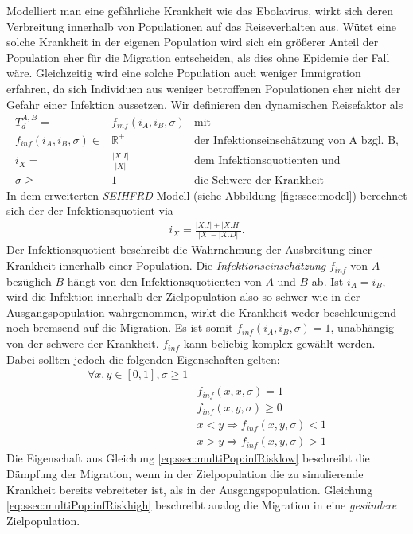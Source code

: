 Modelliert man eine gefährliche Krankheit wie das Ebolavirus, wirkt sich deren Verbreitung innerhalb von Populationen auf das Reiseverhalten aus. Wütet eine solche Krankheit in der eigenen Population wird sich ein größerer Anteil der Population eher für die Migration entscheiden, als dies ohne Epidemie der Fall wäre. Gleichzeitig wird eine solche Population auch weniger Immigration erfahren, da sich Individuen aus weniger betroffenen Populationen eher nicht der Gefahr einer Infektion aussetzen. Wir definieren den dynamischen Reisefaktor als
\begin{align}
	T^{A,B}_d =& f_{inf}(i_A,i_B, \sigma)&\text{mit}\\
	f_{inf}(i_A,i_B,\sigma) \in& \mathbb{R}^+&\text{der Infektionseinschätzung von A bzgl. B,}\label{eq:ssec:multiPop:infRisk}\\
	i_X =& \frac{|X.I|}{|X|}&\text{dem Infektionsquotienten und}\\
	\sigma \geq&1 & \text{die Schwere der Krankheit}
\end{align}
In dem erweiterten \emph{SEIHFRD}-Modell (siehe Abbildung \ref{fig:ssec:model}) berechnet sich der der Infektionsquotient via 
\begin{align}
	i_X = \frac{|X.I|+|X.H|}{|X| - |X.D|}.
\end{align}
Der Infektionsquotient beschreibt die Wahrnehmung der Ausbreitung einer Krankheit innerhalb einer Population. Die \emph{Infektionseinschätzung} $f_{inf}$ von $A$ bezüglich $B$ hängt von den Infektionsquotienten von $A$ und $B$ ab. Ist $i_A = i_B$, wird die Infektion innerhalb der Zielpopulation also so schwer wie in der Ausgangspopulation wahrgenommen, wirkt die Krankheit weder beschleunigend noch bremsend auf die Migration. Es ist somit $f_{inf}(i_A,i_B,\sigma)=1$, unabhängig von der schwere der Krankheit. $f_{inf}$ kann beliebig komplex gewählt werden. Dabei sollten jedoch die folgenden Eigenschaften gelten:
\begin{align}
	\forall x, y \in [0,1], \sigma \geq 1 & \nonumber\\
		& f_{inf}(x,x,\sigma) = 1\\
		& f_{inf}(x,y,\sigma) \geq 0\\
		& x < y \Rightarrow f_{inf}(x,y,\sigma) < 1 \label{eq:ssec:multiPop:infRisklow}\\
		& x > y \Rightarrow f_{inf}(x,y,\sigma) > 1 \label{eq:ssec:multiPop:infRiskhigh}
\end{align}
Die Eigenschaft aus Gleichung \ref{eq:ssec:multiPop:infRisklow} beschreibt die Dämpfung der Migration, wenn in der Zielpopulation die zu simulierende Krankheit bereits vebreiteter ist, als in der Ausgangspopulation. Gleichung \ref{eq:ssec:multiPop:infRiskhigh} beschreibt analog die Migration in eine \emph{gesündere} Zielpopulation.

